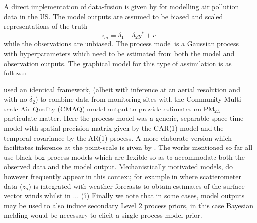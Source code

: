\documentclass[10pt,a4paper]{article}
\begin{document}
A direct implementation of data-fusion is given by \citep{Fuentes_2005} for modelling air pollution data in the US. The model outputs are assumed to be biased and scaled representations of the truth
\begin{equation}
z_m = \delta_1 + \delta_2y^* + e
\end{equation}
\noindent while the observations are unbiased. The process model is a Gaussian process with hyperparameters which need to be estimated from both the model and observation outputs. The graphical model for this type of assimilation is as follows:
\begin{figure}[h!]
\centering
{}
\end{figure}

\noindent \cite{McMillan_2010} used an identical framework, (albeit with inference at an aerial resolution and with no $\delta_2$) to combine data from monitoring sites with the Community Multi-scale Air Quality (CMAQ) model output to provide estimates on PM$_{2.5}$ particulate matter. Here the process model was a generic, separable space-time model with spatial precision matrix given by the CAR(1) model \citep{Rue_2005} and the temporal covariance by the AR(1) process. A more elaborate version which facilitates inference at the point-scale is given by \cite{Sahu_2010}.  The works mentioned so far all use black-box process models which are flexible so as to accommodate both the observed data and the model output. Mechanistically motivated models, do however frequently appear in this context; for example in \citep{Milliff_2011} where scatterometer data ($z_o$) is integrated with weather forecasts to obtain estimates of the surface-vector winds whilst in ... (?) Finally we note that in some cases, model outputs may be used to also induce secondary Level 2 process priors, in this case Bayesian melding \citep{Poole_2000} would be necessary to elicit a single process model prior. 
\end{document}

